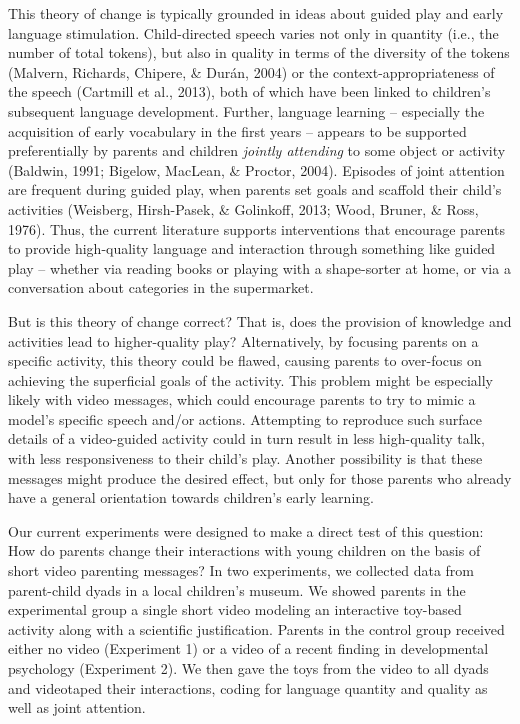 \documentclass[man,floatsintext]{apa6}
\begin{document}
This theory of change is typically grounded in ideas about guided play and early language stimulation.
Child-directed speech varies not only in quantity (i.e., the number of total tokens), but also in quality in terms of the diversity of the tokens (Malvern, Richards, Chipere, \& Durán, 2004) or the context-appropriateness of the speech (Cartmill et al., 2013), both of which have been linked to children's subsequent language development.
Further, language learning -- especially the acquisition of early vocabulary in the first years -- appears to be supported preferentially by parents and children \emph{jointly attending} to some object or activity (Baldwin, 1991; Bigelow, MacLean, \& Proctor, 2004).
Episodes of joint attention are frequent during guided play, when parents set goals and scaffold their child's activities (Weisberg, Hirsh-Pasek, \& Golinkoff, 2013; Wood, Bruner, \& Ross, 1976).
Thus, the current literature supports interventions that encourage parents to provide high-quality language and interaction through something like guided play -- whether via reading books or playing with a shape-sorter at home, or via a conversation about categories in the supermarket.

But is this theory of change correct? That is, does the provision of knowledge and activities lead to higher-quality play?
Alternatively, by focusing parents on a specific activity, this theory could be flawed, causing parents to over-focus on achieving the superficial goals of the activity.
This problem might be especially likely with video messages, which could encourage parents to try to mimic a model's specific speech and/or actions.
Attempting to reproduce such surface details of a video-guided activity could in turn result in less high-quality talk, with less responsiveness to their child's play.
Another possibility is that these messages might produce the desired effect, but only for those parents who already have a general orientation towards children's early learning.

Our current experiments were designed to make a direct test of this question: How do parents change their interactions with young children on the basis of short video parenting messages?
In two experiments, we collected data from parent-child dyads in a local children's museum.
We showed parents in the experimental group a single short video modeling an interactive toy-based activity along with a scientific justification.
Parents in the control group received either no video (Experiment 1) or a video of a recent finding in developmental psychology (Experiment 2).
We then gave the toys from the video to all dyads and videotaped their interactions, coding for language quantity and quality as well as joint attention.
\end{document}
